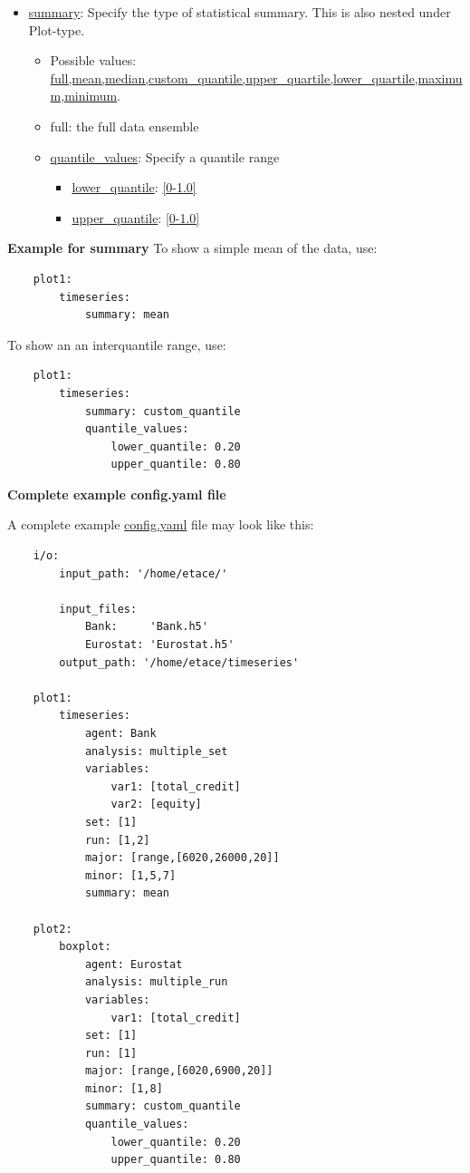 \documentclass[10pt,a4paper]{article}
\begin{document}
\begin{itemize}
\item \url{summary}: Specify the type of statistical summary. This is also nested under Plot-type.
	\begin{itemize}
		\item Possible values: \url{full,mean,median,custom_quantile,upper_quartile,lower_quartile,maximum,minimum}.
		\item full: the full data ensemble
		\item \url{quantile_values}: Specify a quantile range
		\begin{itemize}
			\item \url{lower_quantile}: \url{[0-1.0]}
			\item \url{upper_quantile}: \url{[0-1.0]}
		\end{itemize}
	\end{itemize}
\end{itemize}


\textbf{Example for summary}
To show a simple mean of the data, use:
\begin{lstlisting}
    plot1:
        timeseries:
            summary: mean
\end{lstlisting}

To show an an interquantile range, use:
\begin{lstlisting}
    plot1:
        timeseries:
            summary: custom_quantile
            quantile_values:
            	lower_quantile: 0.20
            	upper_quantile: 0.80
\end{lstlisting}


\bigskip
\textbf{Complete example config.yaml file}

A complete example \url{config.yaml} file may look like this:
\begin{lstlisting}
    i/o:
        input_path: '/home/etace/'
        
        input_files:         
            Bank:     'Bank.h5'
            Eurostat: 'Eurostat.h5'
        output_path: '/home/etace/timeseries'
        
    plot1:
        timeseries:
            agent: Bank
            analysis: multiple_set
            variables: 
                var1: [total_credit]  
                var2: [equity]     
            set: [1]
            run: [1,2]
            major: [range,[6020,26000,20]]
            minor: [1,5,7] 
            summary: mean
            
    plot2:
        boxplot:
            agent: Eurostat
            analysis: multiple_run
            variables: 
                var1: [total_credit]       
            set: [1]
            run: [1]
            major: [range,[6020,6900,20]]
            minor: [1,8] 
            summary: custom_quantile
            quantile_values:
            	lower_quantile: 0.20
            	upper_quantile: 0.80            
\end{lstlisting} 
\end{document}
